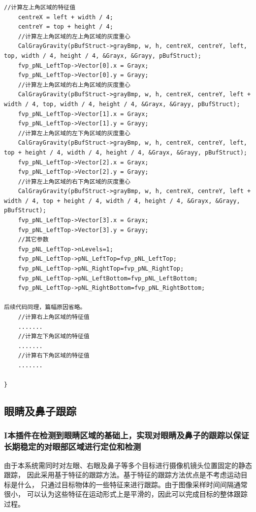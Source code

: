 \documentclass[12pt,hyperref,a4paper,UTF8]{ctexart}
\begin{document}
\begin{lstlisting}[caption={跟踪体特征提取函数}, label={lst:example}]
    //计算左上角区域的特征值
    centreX = left + width / 4;
    centreY = top + height / 4;
    //计算左上角区域的左上角区域的灰度重心
    CalGrayGravity(pBufStruct->grayBmp, w, h, centreX, centreY, left, top, width / 4, height / 4, &Grayx, &Grayy, pBufStruct);
    fvp_pNL_LeftTop->Vector[0].x = Grayx;
    fvp_pNL_LeftTop->Vector[0].y = Grayy;
    //计算左上角区域的右上角区域的灰度重心
    CalGrayGravity(pBufStruct->grayBmp, w, h, centreX, centreY, left + width / 4, top, width / 4, height / 4, &Grayx, &Grayy, pBufStruct);
    fvp_pNL_LeftTop->Vector[1].x = Grayx;
    fvp_pNL_LeftTop->Vector[1].y = Grayy;
    //计算左上角区域的左下角区域的灰度重心
    CalGrayGravity(pBufStruct->grayBmp, w, h, centreX, centreY, left, top + height / 4, width / 4, height / 4, &Grayx, &Grayy, pBufStruct);
    fvp_pNL_LeftTop->Vector[2].x = Grayx;
    fvp_pNL_LeftTop->Vector[2].y = Grayy;
    //计算左上角区域的右下角区域的灰度重心
    CalGrayGravity(pBufStruct->grayBmp, w, h, centreX, centreY, left + width / 4, top + height / 4, width / 4, height / 4, &Grayx, &Grayy, pBufStruct);
    fvp_pNL_LeftTop->Vector[3].x = Grayx;
    fvp_pNL_LeftTop->Vector[3].y = Grayy;
    //其它参数
    fvp_pNL_LeftTop->nLevels=1;
    fvp_pNL_LeftTop->pNL_LeftTop=fvp_pNL_LeftTop;
    fvp_pNL_LeftTop->pNL_RightTop=fvp_pNL_RightTop;
    fvp_pNL_LeftTop->pNL_LeftBottom=fvp_pNL_LeftBottom;
    fvp_pNL_LeftTop->pNL_RightBottom=fvp_pNL_RightBottom;

后续代码同理，篇幅原因省略。
    //计算右上角区域的特征值
    .......
    //计算左下角区域的特征值
    .......
    //计算右下角区域的特征值
    .......

}
        \end{lstlisting}



    \subsection{眼睛及鼻子跟踪}

        \subsubsection*{I本插件在检测到眼睛区域的基础上，实现对眼睛及鼻子的跟踪以保证长期稳定的对眼部区域进行定位和检测}

        由于本系统需同时对左眼、右眼及鼻子等多个目标进行摄像机镜头位置固定的静态跟踪，
        因此采用基于特征的跟踪方法。基于特征的跟踪方法优点是不考虑运动目标是什么，
        只通过目标物体的一些特征来进行跟踪。由于图像采样时间间隔通常很小，
        可以认为这些特征在运动形式上是平滑的，因此可以完成目标的整体跟踪过程。
\end{document}
